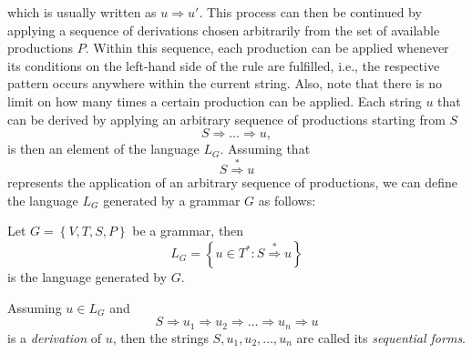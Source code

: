 which is usually written as $u \Rightarrow u'$.
This process can then be continued by applying a sequence of derivations chosen arbitrarily from the set of available productions $P$.
Within this sequence, each production can be applied whenever its conditions on the left-hand side of the rule are fulfilled, i.e., the respective pattern occurs anywhere within the current string.
Also, note that there is no limit on how many times a certain production can be applied.
Each string $u$ that can be derived by applying an arbitrary sequence of productions starting from $S$
\begin{equation}
	S \Rightarrow \dots \Rightarrow u,
\end{equation}
is then an element of the language $L_G$.
Assuming that 
\begin{equation}
	S \overset{*}{\Rightarrow} u
\end{equation}
represents the application of an arbitrary sequence of productions, we can define the language $L_G$ generated by a grammar $G$ as follows:
\begin{definition}[Language]\label{def:language}
	Let $G = \left\{V, T, S, P\right\}$ be a grammar, then
	\begin{equation}
		L_G = \left\{u \in T^* : S \overset{*}{\Rightarrow} u\right\}
	\end{equation}
is the language generated by $G$.
\end{definition}
Assuming $u \in L_G$ and 
\begin{equation}
	S \Rightarrow u_1 \Rightarrow u_2 \Rightarrow \dots \Rightarrow u_n \Rightarrow u
\end{equation}
is a \emph{derivation} of $u$, then the strings $S, u_1, u_2, \dots, u_n$ are called its \emph{sequential forms}.
